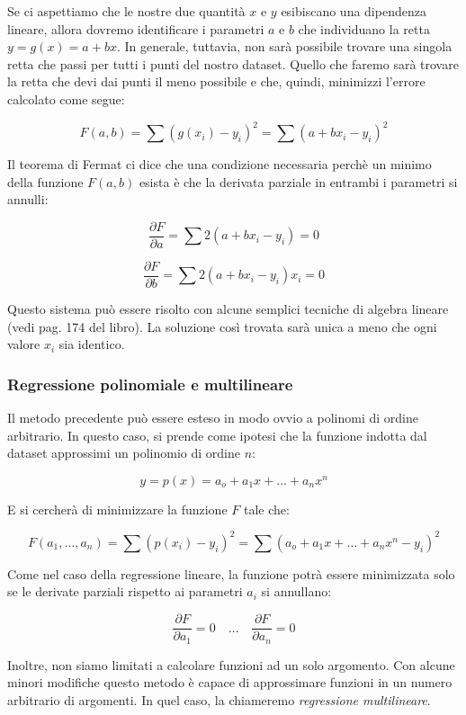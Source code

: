 \documentclass[10pt,a4paper]{article}
\begin{document}
Se ci aspettiamo che le nostre due quantità $x$ e $y$ esibiscano una dipendenza lineare, allora dovremo identificare i parametri $a$ e $b$ che individuano la retta $y = g(x) = a + bx$. In generale, tuttavia, non sarà possibile trovare una singola retta che passi per tutti i punti del nostro dataset. Quello che faremo sarà trovare la retta che devi dai punti il meno possibile e che, quindi, minimizzi l'errore calcolato come segue: 

$$
F(a,b) = \sum(g(x_i) - y_i)^2 = \sum(a + bx_i - y_i)^2
$$

Il teorema di Fermat ci dice che una condizione necessaria perchè un minimo della funzione $F(a,b)$ esista è che la derivata parziale in entrambi i parametri si annulli:

$$
\frac{\partial F}{\partial a} = \sum 2(a + bx_i - y_i) = 0
$$

$$
\frac{\partial F}{\partial b} = \sum 2(a + bx_i - y_i)x_i = 0
$$

Questo sistema può essere risolto con alcune semplici tecniche di algebra lineare (vedi pag. 174 del libro). La soluzione così trovata sarà unica a meno che ogni valore $x_i$ sia identico. 

\subsubsection{Regressione polinomiale e multilineare}

Il metodo precedente può essere esteso in modo ovvio a polinomi di ordine arbitrario. In questo caso, si prende come ipotesi che la funzione indotta dal dataset approssimi un polinomio di ordine $n$:

$$
y = p(x) = a_o + a_1x + \dots + a_nx^n
$$

E si cercherà di minimizzare la funzione $F$ tale che:

$$
F(a_1,\dots,a_n) = \sum(p(x_i) - y_i)^2 = \sum(a_o + a_1x + \dots + a_nx^n -y_i)^2
$$

Come nel caso della regressione lineare, la funzione potrà essere minimizzata solo se le derivate parziali rispetto ai parametri $a_i$ si annullano:

$$
\frac{\partial F}{\partial a_1} = 0 \quad \dots \quad \frac{\partial F}{\partial a_n} = 0
$$

Inoltre, non siamo limitati a calcolare funzioni ad un solo argomento. Con alcune minori modifiche questo metodo è capace di approssimare funzioni in un numero arbitrario di argomenti. In quel caso, la chiameremo \emph{regressione multilineare}.
\end{document}
